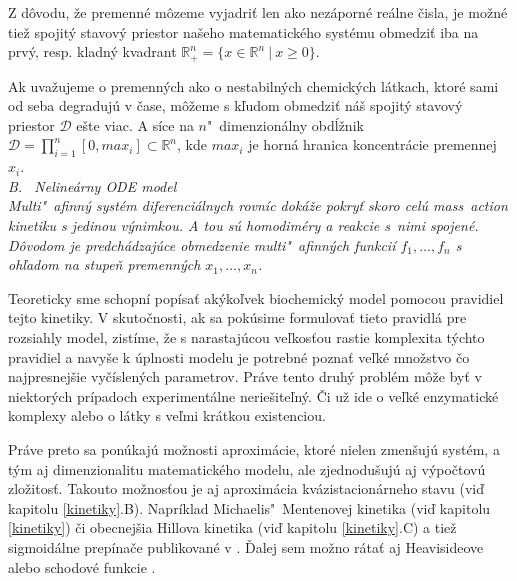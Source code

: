 \documentclass[11pt,final,oneside]{fithesis}
\begin{document}
Z d\^ ovodu, \v ze premenn\'e m\^ ozeme vyjadri\v t len ako nez\'aporn\'e re\'alne \v cisla, je mo\v zn\'e tie\v z spojit\'y stavov\'y priestor na\v seho 
matematick\'eho syst\'emu obmedzi\v t iba na prv\'y, resp. kladn\'y kvadrant {$\mathbb{R}_+^n = \lbrace{}  x \in \mathbb{R}^n\ |\ {}x \geq 0  \rbrace$}.

Ak uva\v zujeme o premenn\'ych ako o nestabiln\'ych chemick\'ych l\'atkach, ktor\'e sami od seba degraduj\'u v \v case, m\^ o\v zeme s k\v ludom obmedzi\v t 
n\'a\v s spojit\'y stavov\'y priestor $\mathcal{D}$ e\v ste viac. A s\'ice na $n$"~dimenzion\'alny obd\'l\v znik $\mathcal{D} = \prod_{i=1}^n[0,max_i] 
\subset \mathbb{R}^n$, kde $max_i$ je horn\'a hranica koncentr\'acie pre\-men\-nej $x_i$.
\cite{HIBI-2009}\cite{HIBI-2010}
\\

\noindent
\it B. \ Neline\'arny ODE model\rm%
\\

Multi"~afinn\'y syst\'em diferenci\'alnych rovn\'ic dok\'a\v ze pokry\v t skoro cel\'u mass~action kinetiku s jedinou v\'ynimkou. A tou s\'u 
homodim\'ery a reakcie s~nimi spojen\'e. D\^ ovodom je predch\'adzaj\'uce obmedzenie multi"~afinn\'ych funkci\'i $f_1,\dots{},f_n$ s oh\v ladom 
na stupe\v n premenn\'ych $x_1,\dots{},x_n$.

Teoreticky sme schopn\'i  pop\'isa\v t ak\' yko\v lvek biochemick\'y model pomocou pravidiel tejto kinetiky. V skuto\v cnosti, ak sa pok\'usime formulova\v t 
tieto pravidl\'a pre rozsiahly model, zist\'ime, \v ze s narastaj\'ucou ve\v lkos\v tou rastie komplexita t\'ychto pravidiel a navy\v se k \'uplnosti modelu
je potrebn\'e pozna\v t ve\v lk\'e mno\v zstvo \v co najpresnej\v sie vy\v c\'islen\'ych parametrov. Pr\'ave tento druh\'y probl\'em m\^ o\v ze by\v t 
v niektor\'ych pr\'ipadoch experiment\'alne nerie\v site\v ln\'y. \v Ci u\v z ide o ve\v lk\'e enzymatick\'e komplexy alebo o l\'atky s ve\v lmi 
kr\'atkou existenciou.%

Pr\'ave preto sa pon\'ukaj\'u mo\v znosti aproxim\'acie, ktor\'e nielen zmen\v suj\'u syst\'em, a t\'ym aj dimenzionalitu matematick\'eho modelu, 
ale zjednodu\v suj\'u aj v\'ypo\v ctov\'u zlo\v zitos\v t. Takouto mo\v znos\v tou je aj aproxim\'acia kv\'azistacion\'arneho stavu (vi\v d kapitolu \ref{kinetiky}.B). 
Napr\'iklad Michaelis"~Mentenovej kinetika (vi\v d kapitolu \ref{kinetiky}) 
\v ci obecnej\v sia Hillova kinetika (vi\v d kapitolu \ref{kinetiky}.C) a tie\v z sigmoid\'alne prep\'ina\v ce publikovan\'e v \cite{CAV-2011}. 
\v Dalej sem mo\v zno r\'ata\v t aj Heavisideove alebo schodov\'e funkcie \cite{step}. 
\end{document}
